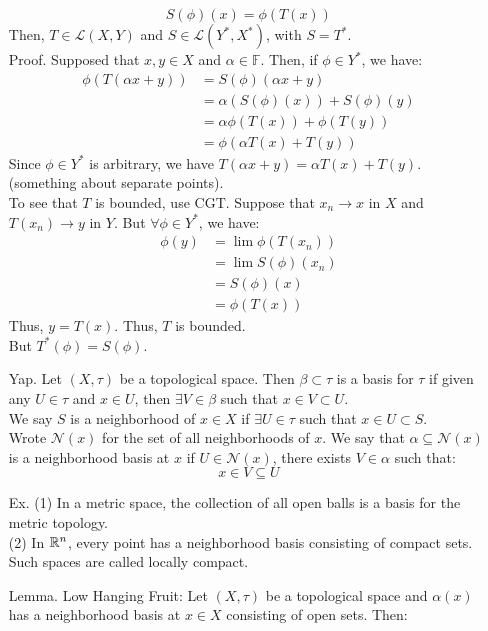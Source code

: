 \documentclass[12pt]{article}
\begin{document}
\begin{itemize}
    \[ S(\phi)(x) = \phi(T(x)) \]
    Then, $T \in \mathcal{L}(X,Y)$ and $S \in \mathcal{L}(Y^*, X^*)$, with $S = T^*$. \\
    Proof. Supposed that $x, y \in X$ and $\alpha \in \mathbb{F}$. Then, if $\phi \in Y^*$, we have:
    \begin{align*}
        \phi(T(\alpha x + y)) &= S(\phi)(\alpha x + y) \\
        &= \alpha(S(\phi)(x)) + S(\phi)(y) \\
        &= \alpha\phi(T(x)) + \phi(T(y)) \\
        &= \phi(\alpha T(x) + T(y)) 
    \end{align*}
    Since $\phi \in Y^*$ is arbitrary, we have $T(\alpha x + y) = \alpha T(x) + T(y)$. (something about separate points). \\
    To see that $T$ is bounded, use CGT. Suppose that $x_n \to x$ in $X$ and $T(x_n) \to y$ in $Y$. But $\forall \phi \in Y^*$, we have: 
    \begin{align*}
        \phi(y) &= \lim \phi(T(x_n)) \\
        &= \lim S(\phi)(x_n) \\
        &= S(\phi)(x) \\
        &= \phi(T(x))
    \end{align*}
    Thus, $y = T(x)$. Thus, $T$ is bounded. \\
    But $T^*(\phi) = S(\phi)$. 
    \item[Yap.] Let $(X, \tau)$ be a topological space. Then $\beta \subset \tau$ is a basis for $\tau$ if given any $U \in \tau$ and $x \in U$, then $\exists V \in \beta$ such that $x \in V \subset U$. \\
    We say $S$ is a neighborhood of $x \in X$ if $\exists U \in \tau$ such that $x \in U \subset S$. \\
    Wrote $\mathcal{N}(x)$ for the set of all neighborhoods of $x$. We say that $\alpha \subseteq \mathcal{N}(x)$ is a neighborhood basis at $x$ if $U \in \mathcal{N}(x)$, there exists $V \in \alpha$ such that: 
    \[ x \in V \subseteq U \]
    \item[Ex. ] (1) In a metric space, the collection of all open balls is a basis for the metric topology. \\
    (2) In $\mathbb R^n$, every point has a neighborhood basis consisting of compact sets. Such spaces are called locally compact.
    \item[Lemma.] Low Hanging Fruit: Let $(X , \tau)$ be a topological space and $\alpha(x)$ has a neighborhood basis at $x \in X$ consisting of open sets. Then: 

\end{itemize}
\end{document}
